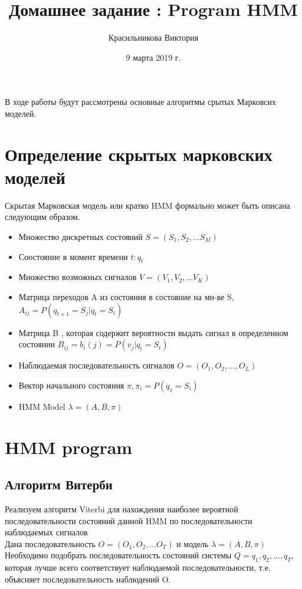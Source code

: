 \documentclass[a4paper,12pt]{article}
\author{Красильникова Виктория}
\title{Домашнее задание :
	Program HMM
	}
\date{9 марта 2019 г.}
\theoremstyle{plain} %
\theoremstyle{definition} %
\theoremstyle{remark} %
\begin{document}
	
	\maketitle
	В ходе работы будут рассмотрены основные алгоритмы срытых Марковсих моделей. 
	\section{Определение скрытых марковских моделей}
	Скрытая Марковская модель или кратко HMM формально может быть описана следующим образом.
	\begin{itemize}
		\item 
		Множество дискретных состояний $S = (S_1,S_2,... S_M)$
		\item 
		Соостояние в момент времени $t: q_t$ 
		\item 
		Множество возможных сигналов $V = (V_1,V_2,... V_K)$
		\item
		Матрица переходов A из состояния  в состояние на мн-ве S, $A_{ij} = P(q_{t+1} = S_j | q_t = S_i)$
		\item
		Матрица B , которая содержит вероятности выдать сигнал в определенном состоянии 
		$B_{ij} = b_i(j) = P ( v_j | q_t = S_i )$
		\item
		Наблюдаемая последовательность сигналов $O=(O_1,O_2,...,O_L)$
		\item
		Вектор начального состояния $\pi , \pi_i = P(q_1 = S_i)$ 
		\item 
		HMM Model  $\lambda = 	(A,B, \pi)$
		
	\end{itemize}
	
	
	\section{HMM program}
	\subsection{Алгоритм Витерби}
		Реализуем алгоритм Viterbi для нахождения наиболее вероятной последовательности состояний данной HMM по последовательности наблюдаемых сигналов
	\\
	Дана последовательность $O = (O_1 , O_2, ... O_T)$ и модель $\lambda = (A,B, \pi)$	
	\\
	Необходимо подобрать последовательность состояний системы $ Q = q_1,q_2,...,q_T$, которая лучше всего соответствует наблюдаемой последовательности, т.е. объясняет последовательность наблюдений O.\\
\end{document}
